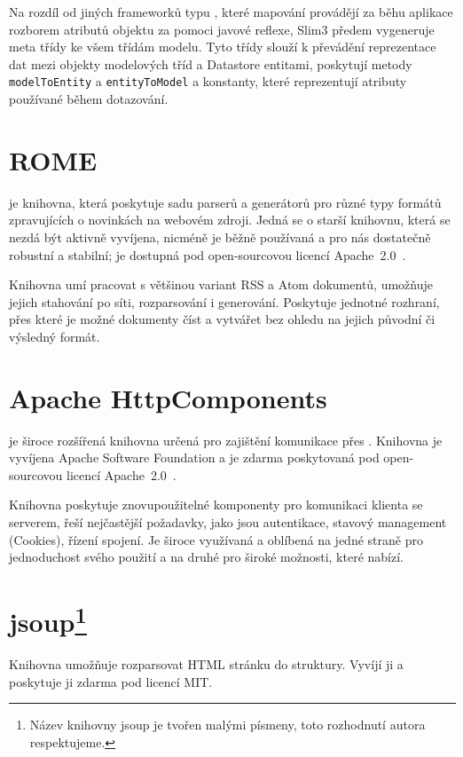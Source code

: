 Na rozdíl od jiných  frameworků typu , které mapování provádějí za běhu aplikace rozborem atributů objektu za pomoci javové reflexe, Slim3 předem vygeneruje meta třídy ke všem třídám modelu.
Tyto třídy slouží k převádění reprezentace dat mezi objekty modelových tříd a Datastore entitami, poskytují metody \verb|modelToEntity| a \verb|entityToModel| a konstanty, které reprezentují atributy používané během dotazování.

\section{ROME}
 je knihovna, která poskytuje sadu parserů a generátorů pro různé typy formátů zpravujících o novinkách na webovém zdroji.
Jedná se o starší knihovnu, která se nezdá být aktivně vyvíjena, nicméně je běžně používaná a pro nás dostatečně robustní a stabilní; je dostupná pod open-sourcovou licencí Apache~2.0~\cite{apache20}.

Knihovna umí pracovat s většinou variant RSS a Atom dokumentů, umožňuje jejich stahování po síti, rozparsování i generování.
Poskytuje jednotné rozhraní, přes které je možné dokumenty číst a vytvářet bez ohledu na jejich původní či výsledný formát.

\section{Apache HttpComponents}
 je široce rozšířená knihovna určená pro zajištění komunikace přes .
Knihovna je vyvíjena Apache Software Foundation a je zdarma poskytovaná pod open-sourcovou licencí Apache~2.0~\cite{apache20}.

Knihovna poskytuje znovupoužitelné komponenty pro komunikaci klienta se serverem, řeší nejčastější požadavky, jako jsou autentikace, stavový management (Cookies), řízení spojení.
Je široce využívaná a oblíbená na jedné straně pro jednoduchost svého použití a na druhé pro široké možnosti, které nabízí.

\section{\texorpdfstring{jsoup\footnote{Název knihovny jsoup je tvořen malými písmeny, toto rozhodnutí autora respektujeme.}}{jsoup}}
Knihovna  umožňuje rozparsovat HTML stránku do  struktury.
Vyvíjí ji  a poskytuje ji zdarma pod licencí MIT.


